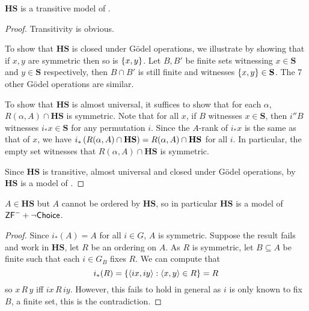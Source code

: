 \begin{theorem} \label{theorem:f-k-model-zfminus}
    \(\mathbf{HS}\) is a transitive model of \ZFminus.
\end{theorem}
\begin{proof}
    Transitivity is obvious.

    To show that \(\mathbf{HS}\) is closed under Gödel operations,
    we illustrate by showing that if \(x,y\) are symmetric then so is \({\left\{ x,y \right\}}\).
    Let \(B, B'\) be finite sets witnessing \(x\in \mathbf{S}\) and \(y\in\mathbf{S}\) respectively,
    then \(B\cap B'\) is still finite and witnesses \({\left\{ x,y \right\}} \in \mathbf{S}\).
    The 7 other Gödel operations are similar.

    To show that \(\mathbf{HS}\) is almost universal,
    it suffices to show that for each \(\alpha\),
    \(R(\alpha,A) \cap \mathbf{HS}\) is symmetric.
    Note that for all \(x\), if \(B\) witnesses \(x\in \mathbf{S}\),
    then \(i''B\) witnesses \(i_* x\in \mathbf{S}\) for any permutation \(i\).
    Since the \(A\)-rank of \(i_* x\) is the same as that of \(x\),
    we have \(i_*\left(R(\alpha,A) \cap \mathbf{HS}\right) = R(\alpha,A) \cap \mathbf{HS}\) for all \(i\).
    In particular, the empty set witnesses that \(R(\alpha,A)\cap\mathbf{HS}\) is symmetric.

    Since \(\mathbf{HS}\) is transitive, almost universal and closed under Gödel operations, by  \(\mathbf{HS}\) is a model of \ZFminus.
\end{proof}

\begin{theorem}
    \(A\in\mathbf{HS}\) but \(A\) cannot be ordered by \(\mathbf{HS}\), so in particular
    \(\mathbf{HS}\) is a model of \(\mbox{\normalfont \textsf{ZF}}^- + \lnot{\normalfont\textsf{Choice}}\).
\end{theorem}
\begin{proof}
    Since \(i_*(A) = A\) for all \(i\in G\), \(A\) is symmetric.
    Suppose the result fails and work in \(\mathbf{HS}\), let \(R\) be an ordering on \(A\).
    As \(R\) is symmetric, let \(B\subseteq A\) be finite such that each \(i\in G_B\) fixes \(R\).
    We can compute that
    \[ i_*(R) = {\left\{ \left\langle i x,i y\right\rangle: \left\langle x,y\right\rangle\in R \right\}} = R \]
    so \(x\,R\,y\) iff \(i x\,R\,i y\).
    However, this fails to hold in general as \(i\) is only known to fix \(B\), a finite set, this is the contradiction.
\end{proof}

